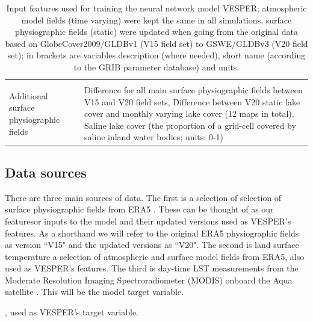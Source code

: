 \documentclass[hess, twostagejnl]{copernicus}
\providecommand{\DIFadd}[1]{{\protect\color{blue} \sf #1}} %
\providecommand{\DIFdel}[1]{{\protect\color{red} \scriptsize #1}} %
\providecommand{\DIFaddbegin}{} %
\providecommand{\DIFaddend}{} %
\providecommand{\DIFdelbegin}{} %
\providecommand{\DIFdelend}{} %
\providecommand{\DIFaddFL}[1]{\DIFadd{#1}} %
\begin{document}
\begin{table}
\begin{tabularx}{\textwidth}{lX}
{}

		\\
		\DIFaddFL{Additional surface physiographic fields               }& \DIFaddFL{Difference for all main surface physiographic fields between V15 and V20 field sets, }\newline 
		\DIFaddFL{Difference between V20 static lake cover and monthly varying lake cover (12 maps in total),}\newline 
		\DIFaddFL{Saline lake cover (the proportion of a grid-cell covered by saline inland water bodies; units: 0-1)
		 }\\
		\hline
	\end{tabularx}
\caption{\DIFaddFL{Input features used for training the neural network model VESPER; atmospheric model fields (time varying) were kept the same in all simulations,  surface  physiographic  fields  (static)  were  updated  when  going  from  the  original  data  based  on GlobeCover2009/GLDBv1 (V15 field set) to GSWE/GLDBv3 (V20 field set); in brackets are variables description (where needed), short name (according to the GRIB parameter database) and units.
}}
\label{table:definitions}
\end{table}

\subsection{\DIFadd{Data sources }}

\DIFadd{There are three main sources of }\DIFaddend data. The first is \DIFdelbegin \DIFdel{a selection of }\DIFdelend \DIFaddbegin \DIFadd{selection of surface physiographic }\DIFaddend fields from ERA5 \DIFdelbegin \DIFdel{\cite{Hersbach}. These can be thought of as our featuresor inputs to the model}\DIFdelend \DIFaddbegin \DIFadd{\citep{Hersbach} and their updated versions \citep{Choulga2019,Boussetta2021,Mu2021} used as VESPER’s features. As a shorthand we will refer to the original ERA5 physiographic fields as version ``V15" and the updated versions as ``V20"}\DIFaddend . The second is \DIFdelbegin \DIFdel{land surface temperature }\DIFdelend \DIFaddbegin \DIFadd{a selection of atmospheric and surface model fields from ERA5, also used as VESPER’s features. The third is day-time LST }\DIFaddend measurements from the Moderate Resolution Imaging Spectroradiometer (MODIS) \DIFdelbegin \DIFdel{\cite{MODIS} }\DIFdelend onboard the Aqua satellite \DIFdelbegin \DIFdel{.  This will be the model target variable.}\DIFdelend \DIFaddbegin \DIFadd{\citep{MODIS}, used as VESPER’s target variable. 

}\DIFaddend 
\end{document}
